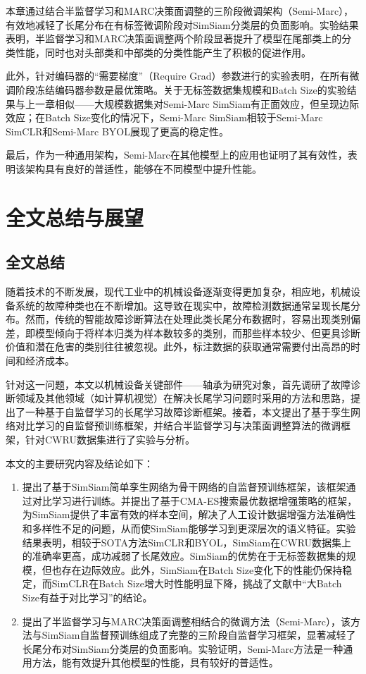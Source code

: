 \documentclass[master]{thesis-uestc}
\begin{document}
本章通过结合半监督学习和MARC决策面调整的三阶段微调架构（Semi-Marc），有效地减轻了长尾分布在有标签微调阶段对SimSiam分类层的负面影响。实验结果表明，半监督学习和MARC决策面调整两个阶段显著提升了模型在尾部类上的分类性能，同时也对头部类和中部类的分类性能产生了积极的促进作用。

此外，针对编码器的“需要梯度”（Require Grad）参数进行的实验表明，在所有微调阶段冻结编码器参数是最优策略。关于无标签数据集规模和Batch Size的实验结果与上一章相似——大规模数据集对Semi-Marc SimSiam有正面效应，但呈现边际效应；在Batch Size变化的情况下，Semi-Marc SimSiam相较于Semi-Marc SimCLR和Semi-Marc BYOL展现了更高的稳定性。

最后，作为一种通用架构，Semi-Marc在其他模型上的应用也证明了其有效性，表明该架构具有良好的普适性，能够在不同模型中提升性能。

\chapter{全文总结与展望}

\section{全文总结}
随着技术的不断发展，现代工业中的机械设备逐渐变得更加复杂，相应地，机械设备系统的故障种类也在不断增加。这导致在现实中，故障检测数据通常呈现长尾分布。然而，传统的智能故障诊断算法在处理此类长尾分布数据时，容易出现类别偏差，即模型倾向于将样本归类为样本数较多的类别，而那些样本较少、但更具诊断价值和潜在危害的类别往往被忽视。此外，标注数据的获取通常需要付出高昂的时间和经济成本。

针对这一问题，本文以机械设备关键部件——轴承为研究对象，首先调研了故障诊断领域及其他领域（如计算机视觉）在解决长尾学习问题时采用的方法和思路，提出了一种基于自监督学习的长尾学习故障诊断框架。接着，本文提出了基于孪生网络对比学习的自监督预训练框架，并结合半监督学习与决策面调整算法的微调框架，针对CWRU数据集进行了实验与分析。

本文的主要研究内容及结论如下：
\begin{enumerate}
    \item 提出了基于SimSiam简单孪生网络为骨干网络的自监督预训练框架，该框架通过对比学习进行训练。并提出了基于CMA-ES搜索最优数据增强策略的框架，为SimSiam提供了丰富有效的样本空间，解决了人工设计数据增强方法准确性和多样性不足的问题，从而使SimSiam能够学习到更深层次的语义特征。实验结果表明，相较于SOTA方法SimCLR和BYOL，SimSiam在CWRU数据集上的准确率更高，成功减弱了长尾效应。SimSiam的优势在于无标签数据集的规模，但也存在边际效应。此外，SimSiam在Batch Size变化下的性能仍保持稳定，而SimCLR在Batch Size增大时性能明显下降，挑战了文献\cite{chen2020simple}中“大Batch Size有益于对比学习”的结论。
    \item 提出了半监督学习与MARC决策面调整相结合的微调方法（Semi-Marc），该方法与SimSiam自监督预训练组成了完整的三阶段自监督学习框架，显著减轻了长尾分布对SimSiam分类层的负面影响。实验证明，Semi-Marc方法是一种通用方法，能有效提升其他模型的性能，具有较好的普适性。
\end{enumerate}
\end{document}
